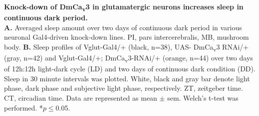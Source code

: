 \label{fig:6}
\textbf{Knock-down of DmCa\textsubscript{v}3 in glutamatergic neurons increases sleep in continuous dark period.}
\\
\textbf{A.} Averaged sleep amount over two days of continuous dark period in various neuronal Gal4-driven knock-down lines.
PI, pars intercerebralis, MB, mushroom body.
\textbf{B.} Sleep profiles of Vglut-Gal4/+ (black, n=38), UAS- DmCa\textsubscript{v}3 RNAi/+ (gray, n=42) and Vglut-Gal4/+; DmCa\textsubscript{v}3-RNAi/+ (orange, n=44) over two days of 12h:12h light-dark cycle (LD) and two days of continuous dark condition (DD).
Sleep in 30 minute intervals was plotted.
White, black and gray bar denote light phase, dark phase and subjective light phase, respectively.
ZT, zeitgeber time.
CT, circadian time.
Data are represented as mean $\pm$ sem.
Welch's t-test was performed.
*$p\le$0.05.